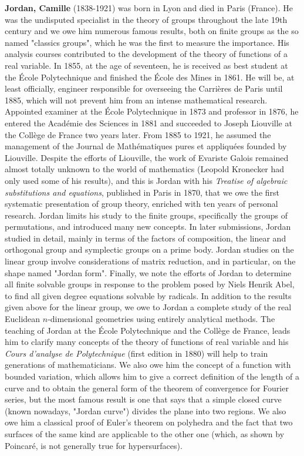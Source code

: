\textbf{Jordan, Camille} (1838-1921) was born in Lyon and died in Paris (France). He was the undisputed specialist in the theory of groups throughout the late 19th century and we owe him numerous famous results, both on finite groups as the so named "classics groups", which he was the first to measure the importance. His analysis courses contributed to the development of the theory of functions of a real variable. In 1855, at the age of seventeen, he is received as best student at the École Polytechnique and finished the École des Mines in 1861. He will be, at least officially, engineer responsible for overseeing the Carrières de Paris until 1885, which will not prevent him from an intense mathematical research. Appointed examiner at the École Polytechnique in 1873 and professor in 1876, he entered the Académie des Sciences in 1881 and succeeded to Joseph Liouville at the Collège de France two years later. From 1885 to 1921, he assumed the management of the Journal de Mathématiques pures et appliquées founded by Liouville. Despite the efforts of Liouville, the work of Evariste Galois remained almost totally unknown to the world of mathematics (Leopold Kronecker had only used some of his results), and this is Jordan with his \textit{Treatise of algebraic substitutions and equations}, published in Paris in 1870, that we owe the first systematic presentation of group theory, enriched with ten years of personal research. Jordan limits his study to the finite groups, specifically the groups of permutations, and introduced many new concepts. In later submissions, Jordan studied in detail, mainly in terms of the factors of composition, the linear and orthogonal group and symplectic groups on a prime body. Jordan studies on the linear group involve considerations of matrix reduction, and in particular, on the shape named "Jordan form". Finally, we note the efforts of Jordan to determine all finite solvable groups in response to the problem posed by Niels Henrik Abel, to find all given degree equations solvable by radicals. In addition to the results given above for the linear group, we owe to Jordan a complete study of the real Euclidean $n$-dimensional geometries using entirely analytical methods. The teaching of Jordan at the École Polytechnique and the Collège de France, leads him to clarify many concepts of the theory of functions of real variable and his \textit{Cours d'analyse de Polytechnique} (first edition in 1880) will help to train generations of mathematicians. We also owe him the concept of a function with bounded variation, which allows him to give a correct definition of the length of a curve and to obtain the general form of the theorem of convergence for Fourier series, but the most famous result is one that says that a simple closed curve (known nowadays, "Jordan curve") divides the plane into two regions.  We also owe him a classical proof of Euler's theorem on polyhedra and the fact that two surfaces of the same kind are applicable to the other one (which, as shown by Poincaré, is not generally true for hypersurfaces).

